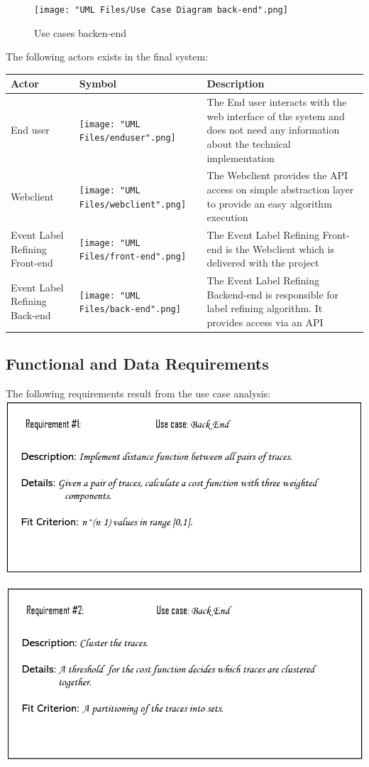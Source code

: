\documentclass[notitlepage]{article}
\begin{document}
\begin{flushleft}
\begin{figure}[h!]
  \texttt{[image: "UML Files/Use Case Diagram back-end".png]}
  \caption{Use cases backen-end}
  \label{fig:back-end}
\end{figure}
\clearpage
The following actors exists in the final system:\\
\medskip
\begin{tabularx}{\textwidth}{|m{4cm}|m{4cm}|m{8cm}|}
	\hline
	\textbf{Actor} 
	&\textbf{Symbol}
	&\textbf{Description}\\
	\hline
	End user & \texttt{[image: "UML Files/enduser".png]} & The End user interacts with the web interface of the system and does not need any information about the technical implementation\\
	\hline
	Webclient & \texttt{[image: "UML Files/webclient".png]} & The Webclient provides the API access on simple abstraction layer to provide an easy algorithm execution\\
	\hline
	Event Label Refining Front-end & \texttt{[image: "UML Files/front-end".png]} & The Event Label Refining Front-end is the Webclient which is delivered with the project \\
	\hline
	Event Label Refining Back-end & \texttt{[image: "UML Files/back-end".png]} & The Event Label Refining Backend-end is responsible for label refining algorithm. It provides access via an API \\
	\hline
\end{tabularx}

\subsection{Functional and Data Requirements}
The following requirements result from the use case analysis:\\
\medskip
\includegraphics[scale=0.6]{Req1.png}

\includegraphics[scale=0.6]{Req2.png}


\end{flushleft}
\end{document}
